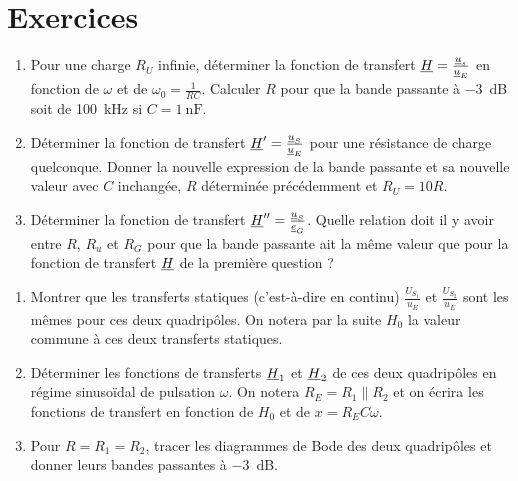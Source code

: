 \section{Exercices}
\begin{exercice}
	\begin{enumerate}
		\item Pour une charge \(R_U\) infinie, déterminer la fonction de transfert \(\underline{H} = \frac{\underline{u}_s}{\underline{u}_E}\) en fonction de \(\omega\) et de \(\omega_0 = \frac{1}{RC}\). Calculer \(R\) pour que la bande passante à \SI{-3}{\dB} soit de \SI{100}{\kilo\hertz} si \(C=\SI{1}{\nano\farad}\).
		\item Déterminer la fonction de transfert \(\underline{H}' = \frac{\underline{u}_S}{\underline{u}_E}\) pour une résistance de charge quelconque. Donner la nouvelle expression de la bande passante et sa nouvelle valeur avec \(C\) inchangée, \(R\) déterminée précédemment et \(R_U = 10 R\).
		\item Déterminer la fonction de transfert \(\underline{H}'' = \frac{\underline{u}_S}{\underline{e}_G}\). Quelle relation doit il y avoir entre \(R\), \(R_u\) et \(R_G\) pour que la bande passante ait la même valeur que pour la fonction de transfert \(\underline{H}\) de la première question ?
	\end{enumerate}
\end{exercice}
\begin{exercice}
	\begin{enumerate}
		\item Montrer que les transferts statiques (c'est-à-dire en continu) \(\frac{U_{S_1}}{u_E}\) et \(\frac{U_{S_2}}{u_E}\) sont les mêmes pour ces deux quadripôles. On notera par la suite \(H_0\) la valeur commune à ces deux transferts statiques.
		\item Déterminer les fonctions de transferts \(\underline{H}_1\) et \(\underline{H}_2\) de ces deux quadripôles en régime sinusoïdal de pulsation \(\omega\). On notera \(R_E = R_1 \parallel R_2\) et on écrira les fonctions de transfert en fonction de \(H_0\) et de \(x = R_E C \omega\).
		\item Pour \(R = R_1 = R_2\), tracer les diagrammes de Bode des deux quadripôles et donner leurs bandes passantes à \SI{-3}{\dB}.
	\end{enumerate}
\end{exercice}
